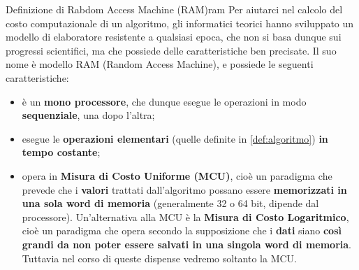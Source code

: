 \documentclass[12pt]{report}
\begin{document}
	\begin{definizione}{Definizione di Rabdom Access Machine (RAM)}{ram}
        Per aiutarci nel calcolo del costo computazionale di un algoritmo, gli informatici teorici hanno sviluppato un modello di elaboratore resistente a qualsiasi epoca, che non si basa dunque sui progressi scientifici, ma che possiede delle caratteristiche ben precisate. Il suo nome è modello RAM (Random Access Machine), e possiede le seguenti caratteristiche:
        \begin{itemize}
        
        	\item è un \textbf{mono processore}, che dunque esegue le operazioni in modo \textbf{sequenziale}, una dopo l’altra;
        		
        	\item esegue le \textbf{operazioni elementari} (quelle definite in \ref{def:algoritmo}) \textbf{in tempo costante};
        	
        	\item opera in \textbf{Misura di Costo Uniforme (MCU)}, cioè un paradigma che prevede che i \textbf{valori} trattati dall’algoritmo possano essere \textbf{memorizzati in una sola word di memoria} (generalmente 32 o 64 bit, dipende dal processore). Un’alternativa alla MCU è la \textbf{Misura di Costo Logaritmico}, cioè un paradigma che opera secondo la supposizione che i \textbf{dati} siano \textbf{così grandi da non poter essere salvati in una singola word di memoria}. Tuttavia nel corso di queste dispense vedremo soltanto la MCU.
        			
        \end{itemize}
    \end{definizione}
        
\end{document}
